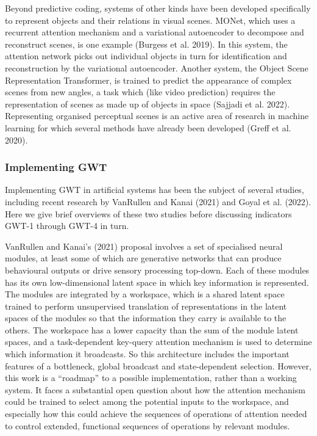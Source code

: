 \documentclass[12pt]{article}
\begin{document}
Beyond predictive coding, systems of other kinds have been developed specifically to represent objects and their relations in visual scenes. MONet, which uses a recurrent attention mechanism and a variational autoencoder to decompose and reconstruct scenes, is one example (Burgess et al. 2019). In this system, the attention network picks out individual objects in turn for identification and reconstruction by the variational autoencoder. Another system, the Object Scene Representation Transformer, is trained to predict the appearance of complex scenes from new angles, a task which (like video prediction) requires the representation of scenes as made up of objects in space (Sajjadi et al. 2022). Representing organised perceptual scenes is an active area of research in machine learning for which several methods have already been developed (Greff et al. 2020).

\subsubsection{Implementing GWT}

Implementing GWT in artificial systems has been the subject of several studies, including recent research by VanRullen and Kanai (2021) and Goyal et al. (2022). Here we give brief overviews of these two studies before discussing indicators GWT-1 through GWT-4 in turn.

VanRullen and Kanai’s (2021) proposal involves a set of specialised neural modules, at least some of which are generative networks that can produce behavioural outputs or drive sensory processing top-down. Each of these modules has its own low-dimensional latent space in which key information is represented. The modules are integrated by a workspace, which is a shared latent space trained to perform unsupervised translation of representations in the latent spaces of the modules so that the information they carry is available to the others. The workspace has a lower capacity than the sum of the module latent spaces, and a task-dependent key-query attention mechanism is used to determine which information it broadcasts. So this architecture includes the important features of a bottleneck, global broadcast and state-dependent selection. However, this work is a ``roadmap'' to a possible implementation, rather than a working system. It faces a substantial open question about how the attention mechanism could be trained to select among the potential inputs to the workspace, and especially how this could achieve the sequences of operations of attention needed to control extended, functional sequences of operations by relevant modules.
\end{document}
